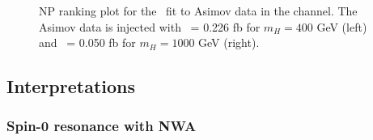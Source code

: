 \begin{figure}[!ht]
\begin{center}
\caption{NP ranking plot for the \xsggF\ fit to Asimov data in the \llll channel.
The Asimov data is injected with \xsggF\ = 0.226 fb for $m_H = 400$ GeV (left) and \xsggF\ = 0.050 fb for $m_H = 1000$ GeV (right).
}
\label{fig:rank_cb_NWA}
\end{center}
\end{figure}

\subsection{Interpretations}

\subsubsection{Spin-0 resonance with NWA}

